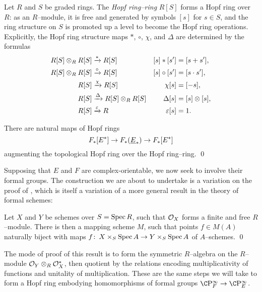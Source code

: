 \begin{definition}
Let \(R\) and \(S\) be graded rings.  The \textit{Hopf ring--ring} \(R[S]\) forms a Hopf ring over \(R\): as an \(R\)--module, it is free and generated by symbols \([s]\) for \(s \in S\), and the ring structure on \(S\) is promoted up a level to become the Hopf ring operations.  Explicitly, the Hopf ring structure maps \(\ast\), \(\circ\), \(\chi\), and \(\Delta\) are determined by the formulas
\begin{align*}
R[S] \otimes_R R[S] & \xrightarrow{\ast} R[S] & [s] \ast [s'] & = [s + s'], \\
R[S] \otimes_R R[S] & \xrightarrow{\circ} R[S] & [s] \circ [s'] & = [s \cdot s'], \\
R[S] & \xrightarrow{\chi} R[S] & \chi [s] & = [-s], \\
R[S] & \xrightarrow{\Delta} R[S] \otimes_R R[S] & \Delta [s] & = [s] \otimes [s], \\
R[S] & \xrightarrow{\varepsilon} R & \varepsilon[s] & = 1.
\end{align*}
\end{definition}

\begin{lemma}
There are natural maps of Hopf rings \[F_*[E^*] \to F_*(\underline{\smash{E}}_{*}) \to F_*[E^*]\] augmenting the topological Hopf ring over the Hopf ring--ring. \qed
\end{lemma}

Supposing that \(E\) and \(F\) are complex-orientable, we now seek to involve their formal groups.  The construction we are about to undertake is a variation on the proof of , which is itself a variation of a more general result in the theory of formal schemes:
\begin{lemma}\label{MappingSchemeStatement}
Let \(X\) and \(Y\) be schemes over \(S = \operatorname{Spec} R\), such that \(\mathcal{O}_X\) forms a finite and free \(R\)--module.  There is then a mapping scheme \(M\), such that points \(f \in M(A)\) naturally biject with maps \(f\colon\thinspace X \times_S \operatorname{Spec} A \to Y \times_S \operatorname{Spec} A\) of \(A\)--schemes. \qed
\end{lemma}

\noindent The mode of proof of this result is to form the symmetric \(R\)--algebra on the \(R\)--module \(\mathcal{O}_Y \otimes_R \mathcal{O}_X^*\), then quotient by the relations encoding multiplicativity of functions and unitality of multiplication.  These are the same steps we will take to form a Hopf ring embodying homomorphisms of formal groups \(\CP^\infty_F \to \CP^\infty_E\).

